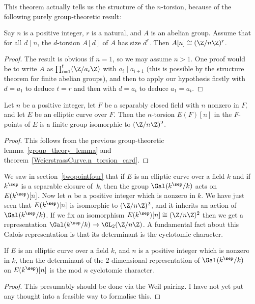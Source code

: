 This theorem actually tells us the structure of the $n$-torsion, because of the following
purely group-theoretic result:
\begin{lemma}\label{group_theory_lemma}
  Say $n$ is a positive integer, $r$ is a natural, and $A$ is an abelian group. Assume that for all $d\mid n$, the $d$-torsion $A[d]$ of $A$ has size $d^r$. Then $A[n]\cong (\Z/n\Z)^r$.
\end{lemma}
\begin{proof}
  The result is obvious if $n=1$, so we may assume $n>1$. One proof would be to write $A$ as $\prod_{i=1}^t(\Z/a_i\Z)$
  with $a_i\mid a_{i+1}$ (this is possible by the structure theorem for finite abelian groups), and then to apply our hypothesis firstly with $d=a_1$ to deduce $t=r$ and then with $d=a_t$ to deduce $a_1=a_t$.
\end{proof}

\begin{corollary}\label{Elliptic_curve_n_torsion_2d}\leanok
  Let $n$ be a positive integer, let $F$ be a separably closed
  field with $n$ nonzero in $F$, and let $E$ be an elliptic curve over $F$. Then the $n$-torsion $E(F)[n]$
  in the $F$-points of $E$ is a finite group isomorphic to $(\Z/n\Z)^2$.
\end{corollary}
\begin{proof}\leanok
  This follows from the previous group-theoretic lemma~\ref{group_theory_lemma} and
  theorem~\ref{WeierstrassCurve.n_torsion_card}.
\end{proof}

We saw in section~\ref{twopointfour} that if $E$ is an elliptic curve over a field $k$ and if $k^{\sep}$ is a separable closure of~$k$, then the group $\Gal(k^{\sep}/k)$ acts on $E(k^{\sep})[n]$. Now let $n$ be a positive integer which is nonzero in $k$. We have just seen that $E(k^{\sep})[n]$ is isomorphic to $(\Z/n\Z)^2$, and it inherits an action of $\Gal(k^{\sep}/k)$. If we fix an isomorphism $E(k^{\sep})[n]\cong(\Z/n\Z)^2$ then we get a representation $\Gal(k^{\sep}/k)\to\GL_2(\Z/n\Z)$. A fundamental fact about this Galois representation is that its determinant is the cyclotomic character.

\begin{theorem}\label{Elliptic_curve_det_n_torsion} If $E$ is an elliptic curve over a field $k$, and $n$ is a positive integer which is nonzero in $k$, then the determinant of the 2-dimensional representation of $\Gal(k^{\sep}/k)$ on $E(k^{\sep})[n]$ is the mod $n$ cyclotomic character.
\end{theorem}
\begin{proof}
  This presumably should be done via the Weil pairing. I have not yet put any thought into a feasible way to formalise this.
\end{proof}

